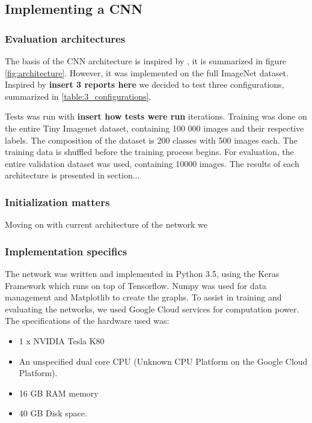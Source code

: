 \documentclass{kthreport}
\begin{document}
\subsection{Implementing a CNN}

\subsubsection{Evaluation architectures}

The basis of the CNN architecture is inspired by \cite{NIPS2012_4824}, it is summarized in figure \ref{fig:architecture}. However, it was implemented on the full ImageNet dataset. Inspired by \textbf{insert 3 reports here} we decided to test three configurations, summarized in \ref{table:3_configurations}.


\FloatBarrier


\FloatBarrier


Tests was run with \textbf{insert how tests were run} iterations. Training was done on the entire Tiny Imagenet dataset, containing 100 000 images and their respective labels. The composition of the dataset is 200 classes with 500 images each. The training data is shuffled before the training process begins. For evaluation, the entire validation dataset was used, containing 10000 images. The results of each architecture is presented in section...

\subsubsection{Initialization matters}

Moving on with current architecture of the network we

\subsubsection{Implementation specifics}

The network was written and implemented in Python 3.5, using the Keras Framework which runs on top of Tensorflow. Numpy was used for data management and Matplotlib to create the graphs. To assist in training and evaluating the networks, we used Google Cloud services for computation power. The specifications of the hardware used was:
\begin{itemize}
\item 1 x NVIDIA Tesla K80
\item An unspecified dual core CPU (Unknown CPU Platform on the Google Cloud Platform). 
\item 16 GB RAM memory
\item 40 GB Disk space.
\end{itemize}
\end{document}
